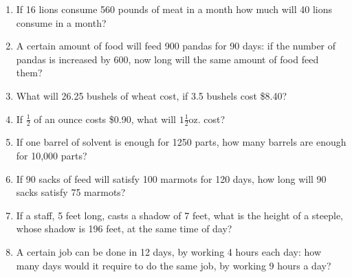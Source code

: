 \documentclass[12pt]{article}
\begin{document}
\begin{enumerate}
\item If 16 lions consume 560 pounds of meat in a month how much will 40 lions consume in a month? 
  \vspace{0.5in}

\item A certain amount of food will feed 900 pandas for 90 days: if the number of pandas is increased by 600, now long will the same amount of food feed them? 
  \vspace{0.5in}

\item What will 26.25 bushels of wheat cost, if 3.5 bushels cost \$8.40? 
  \vspace{0.5in}

\item If $\frac{1}{2}$ of an ounce costs \$0.90, what will $1\frac{1}{2}$oz. cost? 
  \vspace{0.5in}

\item If one barrel of solvent is enough for 1250 parts, how many barrels are enough for 10,000 parts? 
  \vspace{0.5in}

\item If 90 sacks of feed will satisfy 100 marmots for 120 days, how long will 90 sacks satisfy 75 marmots? 
  \vspace{0.5in}

\item If a staff, 5 feet long, casts a shadow of 7 feet, what is the height of a steeple, whose shadow is 196 feet, at the same time of day? 
  \vspace{0.5in}

\item A certain job can be done in 12 days, by working 4 hours each day: how many days would it require to do the same job, by working 9 hours a day? 
  \vspace{0.5in}
 
\end{enumerate}
\end{document}
